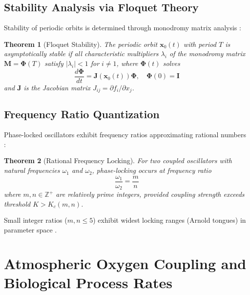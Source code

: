 \documentclass[12pt]{article}
\newtheorem{theorem}{Theorem}[section]
\theoremstyle{remark}
\begin{document}
\begin{figure}[htbp]
{}
\label{fig:multiscale_atlas}
\end{figure}


\subsection{Stability Analysis via Floquet Theory}

Stability of periodic orbits is determined through monodromy matrix analysis \citep{chicone2006ordinary}:

\begin{theorem}[Floquet Stability]
The periodic orbit $\mathbf{x}_0(t)$ with period $T$ is asymptotically stable if all characteristic multipliers $\lambda_i$ of the monodromy matrix $\mathbf{M} = \boldsymbol{\Phi}(T)$ satisfy $|\lambda_i| < 1$ for $i \neq 1$, where $\boldsymbol{\Phi}(t)$ solves
\begin{equation}
\frac{d\boldsymbol{\Phi}}{dt} = \mathbf{J}(\mathbf{x}_0(t))\boldsymbol{\Phi}, \quad \boldsymbol{\Phi}(0) = \mathbf{I}
\end{equation}
and $\mathbf{J}$ is the Jacobian matrix $J_{ij} = \partial f_i/\partial x_j$.
\end{theorem}

\subsection{Frequency Ratio Quantization}

Phase-locked oscillators exhibit frequency ratios approximating rational numbers \citep{glass2001synchronization}:

\begin{theorem}[Rational Frequency Locking]
For two coupled oscillators with natural frequencies $\omega_1$ and $\omega_2$, phase-locking occurs at frequency ratio
\begin{equation}
\frac{\omega_1}{\omega_2} = \frac{m}{n}
\end{equation}
where $m, n \in \mathbb{Z}^+$ are relatively prime integers, provided coupling strength exceeds threshold $K > K_c(m,n)$.
\end{theorem}

Small integer ratios ($m,n \leq 5$) exhibit widest locking ranges (Arnold tongues) in parameter space \citep{jensen1984complete}.

\section{Atmospheric Oxygen Coupling and Biological Process Rates}
\end{document}
